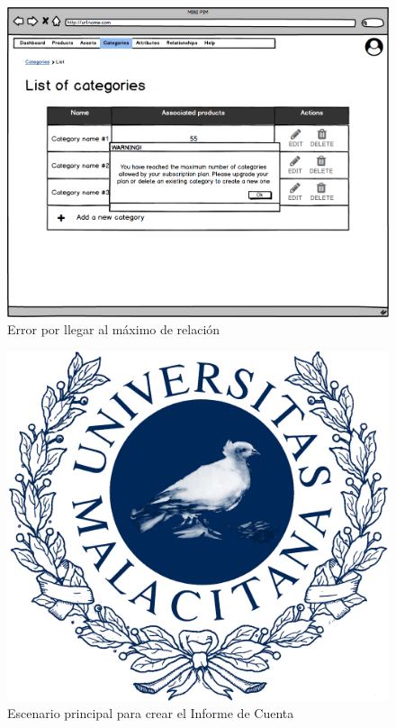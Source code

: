 \begin{figure}[H]
    \includegraphics[width=1\linewidth]{assets/mockups/RF4.1_2.png}
    \caption{Error por llegar al máximo de relación}
   \end{figure}
\vspace{1.0cm}

\newpage %

\begin{figure}[H]
    \includegraphics[width=1\linewidth]{assets/umaLogo.png}
    \caption{Escenario principal para crear el Informe de Cuenta}
   \end{figure}
\vspace{1.0cm}

\newpage %